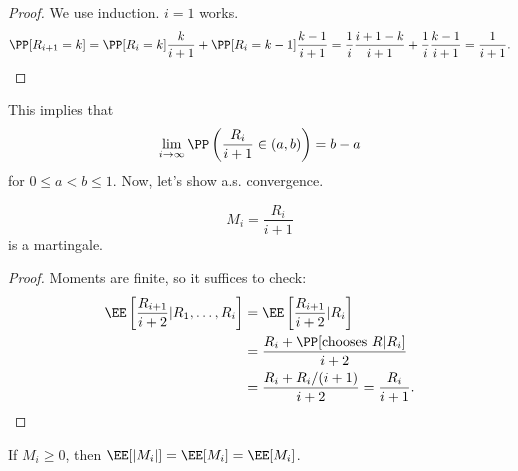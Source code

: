 \begin{proof}
We use induction. $i=1$ works. 
\[\PP[R_{i+1}=k] = \PP[R_i=k]\frac{k}{i+1} + \PP[R_i=k-1]\frac{k-1}{i+1} = \frac{1}{i}\frac{i+1-k}{i+1} + \frac{1}{i}\frac{k-1}{i+1} = \frac{1}{i+1}.\]
\end{proof}

This implies that 
\[\lim_{i\rightarrow \infty}\PP\left(\frac{R_i}{i+1}\in (a,b)\right) = b-a\]
for $0\leq a < b\leq 1$. Now, let's show a.s. convergence. 
\begin{theorem}
\claimlabel

\[M_i = \frac{R_i}{i+1}\] 
is a martingale. 
\end{theorem}

\begin{proof}
Moments are finite, so it suffices to check:
\begin{align*}
	\EE\left[ \frac{R_{i+1}}{i+2} \vert R_1, \hdots, R_i\right] &= \EE\left[ \frac{R_{i+1}}{i+2}\vert R_i\right] \\
																													&= \frac{R_i + \PP[\text{chooses }R | R_i]}{i+2} \\
																													&= \frac{R_i + R_i/(i+1)}{i+2} = \frac{R_i}{i+1}.
\end{align*}
\end{proof}

If $M_i\geq 0$, then $\EE[\vert M_i\vert] = \EE[M_i] = \EE[M_i]$. 
